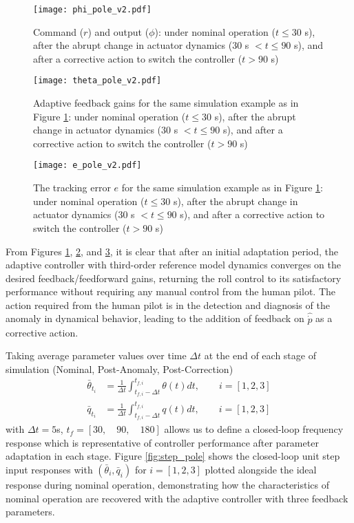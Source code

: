 \begin{figure}[h!]
	\centering
	\texttt{[image: phi\_pole\_v2.pdf]}
	\caption{Command ($r$) and output ($\phi$): under nominal operation ($t \leq 30$ s), after the abrupt change in actuator dynamics ($30$ s $< t \leq 90$ s), and after a corrective action to switch the controller ($t > 90$ s)}
	\label{fig:command_and_output}
\end{figure}

\begin{figure}[h!]
	\centering
	\texttt{[image: theta\_pole\_v2.pdf]}
	\caption{Adaptive feedback gains for the same simulation example as in Figure \ref{fig:command_and_output}: under nominal operation ($t \leq 30$ s), after the abrupt change in actuator dynamics ($30$ s $< t \leq 90$ s), and after a corrective action to switch the controller ($t > 90$ s)}
	\label{fig:theta}
\end{figure}

\begin{figure}[h!]
	\centering
	\texttt{[image: e\_pole\_v2.pdf]}
	\caption{The tracking error $e$ for the same simulation example as in Figure \ref{fig:command_and_output}: under nominal operation ($t \leq 30$ s), after the abrupt change in actuator dynamics ($30$ s $< t \leq 90$ s), and after a corrective action to switch the controller ($t > 90$ s)}
	\label{fig:error}
\end{figure}

From Figures \ref{fig:command_and_output}, \ref{fig:theta}, and \ref{fig:error}, it is clear that after an initial adaptation period, the adaptive controller with third-order reference model dynamics converges on the desired feedback/feedforward gains, returning the roll control to its satisfactory performance without requiring any manual control from the human pilot. The action required from the human pilot is in the detection and diagnosis of the anomaly in dynamical behavior, leading to the addition of feedback on $\hat{\dot{p}}$ as a corrective action. 

Taking average parameter values over time $\Delta t$ at the end of each stage of simulation (Nominal, Post-Anomaly, Post-Correction)
\begin{align}
	\bar{\theta}_{t_i} &= \frac{1}{\Delta t} \int_{t_{f,i}-\Delta t}^{t_{f,i}} \theta(t) dt, \qquad i = [1, 2, 3] \label{eqn:theta_bar}\\
	\bar{q}_{t_i} &= \frac{1}{\Delta t} \int_{t_{f,i}-\Delta t}^{t_{f,i}} q(t) dt, \qquad i = [1, 2, 3] \label{eqn:q_bar}
\end{align}
with $\Delta t = 5$s, $t_f = [30, \quad 90, \quad 180]$ allows us to define a closed-loop frequency response which is representative of controller performance after parameter adaptation in each stage. Figure \ref{fig:step_pole} shows the closed-loop unit step input responses with $(\bar{\theta}_i, \bar{q}_i)$ for $i = [1, 2, 3]$ plotted alongside the ideal response during nominal operation, demonstrating how the characteristics of nominal operation are recovered with the adaptive controller with three feedback parameters.

